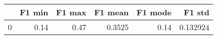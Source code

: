 \begin{tabular}{lrrrrr}
\toprule
{} &  F1 min &  F1 max &  F1 mean &  F1 mode &    F1 std \\
\midrule
0 &    0.14 &    0.47 &   0.3525 &     0.14 &  0.132924 \\
\bottomrule
\end{tabular}
